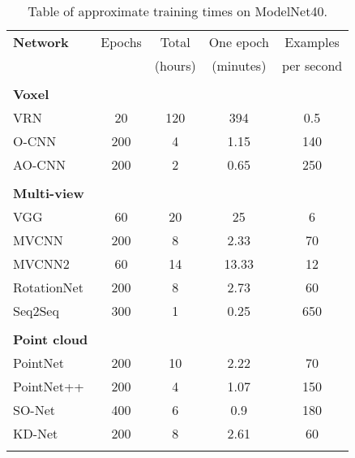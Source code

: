 \begin{table}[]
	\centering
	\begin{tabular}{lcccc}
		\hline
		\textbf{Network}       & Epochs &  Total  & One epoch &  Examples  \\ 
		                       &        & (hours) & (minutes) & per second \\\hline
		                       &        &         &           &            \\
		\textbf{Voxel }        &        &         &           &            \\
		VRN                    &   20   &   120   &    394    &    0.5     \\
		O-CNN                  &  200   &    4    &   1.15    &    140     \\
		AO-CNN                 &  200   &    2    &   0.65    &    250     \\\hline
		                       &        &         &           &            \\
		\textbf{Multi-view }   &        &         &           &            \\
		VGG                    &   60   &   20    &    25     &     6      \\
		MVCNN                  &  200   &    8    &   2.33    &     70     \\
		MVCNN2                 &   60   &   14    &   13.33   &     12     \\
		RotationNet            &  200   &    8    &   2.73    &     60     \\
		Seq2Seq                &  300   &    1    &   0.25    &    650     \\\hline
		                       &        &         &           &            \\
		\textbf{Point cloud  } &        &         &           &            \\
		PointNet               &  200   &   10    &   2.22    &     70     \\
		PointNet++             &  200   &    4    &   1.07    &    150     \\
		SO-Net                 &  400   &    6    &    0.9    &    180     \\
		KD-Net                 &  200   &    8    &   2.61    &     60     \\
		                       &        &         &           &            \\ \hline
	\end{tabular}
\caption{Table of approximate training times on ModelNet40.}
\label{Table:time}
\end{table}